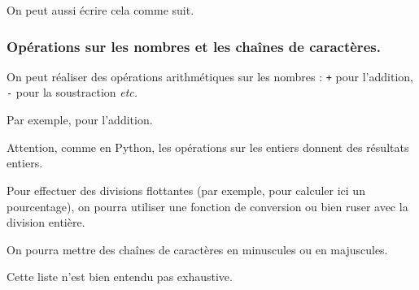 On peut aussi écrire cela comme suit. 

\begin{center}
\end{center}
\subsubsection{Opérations sur les nombres et les chaînes de caractères.}

On peut réaliser des opérations arithmétiques sur les nombres : \texttt{+} pour l'addition, \texttt{-} pour la soustraction \emph{etc.}    

Par exemple, pour l'addition.

\begin{center}
\end{center}

Attention, comme en Python, les opérations sur les entiers donnent des résultats entiers. 

\begin{center}
\end{center}

Pour effectuer des divisions flottantes (par exemple, pour calculer ici un pourcentage), on pourra utiliser une fonction de conversion ou bien ruser avec la division entière.

\begin{center}
\end{center}

On pourra mettre des chaînes de caractères en minuscules ou en majuscules.

\begin{center}
\end{center}

Cette liste n'est bien entendu pas exhaustive. 



